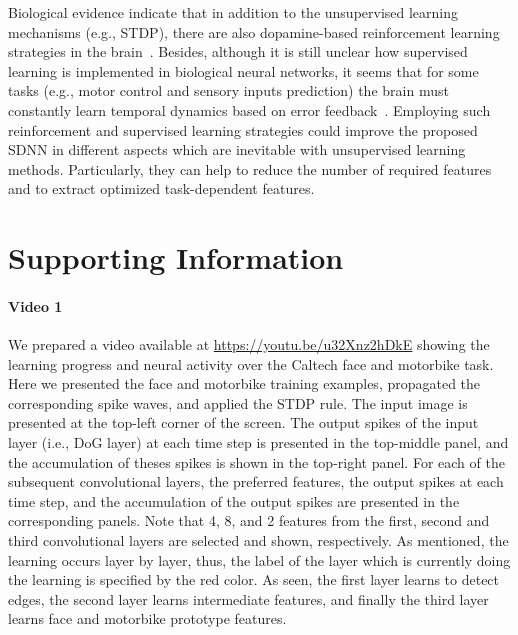 \documentclass[preprint,5p,12pt,twocolumn]{article}
\begin{document}
Biological evidence indicate that in addition to the unsupervised learning mechanisms (e.g., STDP), there are also dopamine-based reinforcement learning strategies in the brain~\cite{pignatelli2015role}. Besides, although it is still unclear how supervised learning is implemented in biological neural networks,  it seems that for some tasks (e.g., motor control and sensory inputs prediction) the brain must constantly learn temporal dynamics based on error feedback~\cite{doya2000complementary}. Employing such reinforcement and supervised learning strategies could improve the proposed SDNN in different aspects which are inevitable with unsupervised learning methods. Particularly, they can help to reduce the number of required features and to extract optimized task-dependent features. 


\section*{Supporting Information}


\paragraph*{Video 1}
\label{S1_Video}
We prepared a video available at \url{https://youtu.be/u32Xnz2hDkE} showing the learning progress and neural activity over the Caltech face and motorbike task. Here we presented the face and motorbike training examples,
propagated the corresponding spike waves, and applied the STDP
rule. The input image is presented at the top-left corner of the screen. The output spikes of the input layer (i.e., DoG layer) at each time step is presented in the top-middle panel, and the accumulation of theses spikes is shown in the top-right panel. For each of the subsequent convolutional layers, the preferred features, the output spikes at each time step, and the accumulation of the output spikes are presented in the corresponding panels. Note that 4, 8, and 2 features from the first, second and third convolutional layers are selected and shown, respectively. As mentioned, the learning occurs layer by layer, thus, the label of the layer which is currently doing the learning is specified by the red color. As seen, the first layer learns to detect edges, the second layer learns intermediate features, and finally the third layer learns face and motorbike prototype features.
\end{document}
